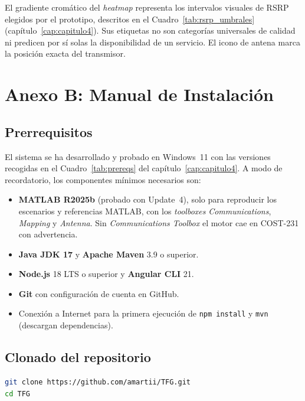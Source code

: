 El gradiente cromático del \textit{heatmap} representa los intervalos visuales de
RSRP elegidos por el prototipo, descritos en el Cuadro~\ref{tab:rsrp_umbrales}
(capítulo~\ref{cap:capitulo4}). Sus etiquetas no son categorías universales de
calidad ni predicen por sí solas la disponibilidad de un servicio. El icono de
antena marca la posición exacta del transmisor.

\chapter{Anexo B: Manual de Instalación}
\label{anx:manual_instalacion}

\section{Prerrequisitos}

El sistema se ha desarrollado y probado en Windows~11 con las versiones recogidas
en el Cuadro~\ref{tab:prereqs} del capítulo~\ref{cap:capitulo4}. A modo de
recordatorio, los componentes mínimos necesarios son:

\begin{itemize}
\item \textbf{MATLAB R2025b} (probado con Update~4), solo para reproducir los
  escenarios y referencias MATLAB, con los \textit{toolboxes}
  \textit{Communications}, \textit{Mapping} y \textit{Antenna}. Sin
  \textit{Communications Toolbox} el motor cae en COST-231 con advertencia.
\item \textbf{Java JDK 17} y \textbf{Apache Maven} 3.9 o superior.
\item \textbf{Node.js} 18 LTS o superior y \textbf{Angular CLI} 21.
\item \textbf{Git} con configuración de cuenta en GitHub.
\item Conexión a Internet para la primera ejecución de \texttt{npm install} y
  \texttt{mvn} (descargan dependencias).
\end{itemize}

\section{Clonado del repositorio}

\begin{lstlisting}[language=bash, caption={Clonado del repositorio.}]
git clone https://github.com/amartii/TFG.git
cd TFG
\end{lstlisting}

